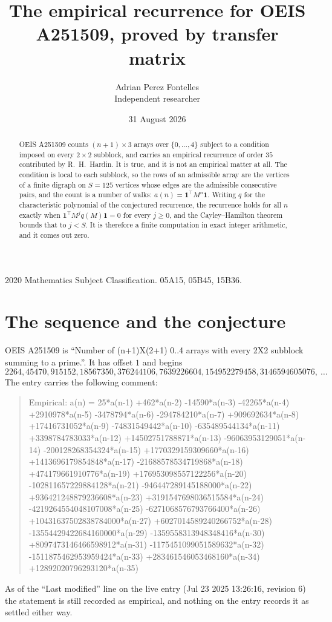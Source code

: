 \documentclass[11pt,a4paper]{article}
\title{The empirical recurrence for OEIS A251509, proved by transfer matrix}
\author{Adrian Perez Fontelles\\ \small Independent researcher}
\date{31 August 2026}
\theoremstyle{plain}
\theoremstyle{definition}
\begin{document}
\maketitle

\begin{abstract}
OEIS A251509 counts $(n+1)\times3$ arrays over $\{0,\dots,4\}$ subject to a condition imposed on
every $2\times2$ subblock, and carries an empirical recurrence of order $35$ contributed
by R.~H.~Hardin. It is true, and it is not an empirical matter at all. The condition is local
to each subblock, so the rows of an admissible array are the vertices of a finite digraph
on $S=125$ vertices whose edges are the admissible consecutive pairs, and the count is a
number of walks: $a(n)=\mathbf{1}^{\!\top}M^{n}\mathbf{1}$. Writing $q$
for the characteristic polynomial of the conjectured recurrence, the recurrence holds for all
$n$ exactly when $\mathbf{1}^{\!\top}M^{j}q(M)\mathbf{1}=0$ for every $j\ge0$, and the
Cayley--Hamilton theorem bounds that to $j<S$. It is therefore a finite computation in exact
integer arithmetic, and it comes out zero.
\end{abstract}

\noindent\small 2020 Mathematics Subject Classification. 05A15, 05B45, 15B36.\normalsize

\section{The sequence and the conjecture}

OEIS A251509 is ``Number of (n+1)X(2+1) 0..4 arrays with every 2X2 subblock summing to a prime.''. It has offset $1$ and begins
\[
2264, 45470, 915152, 18567350, 376244106, 7639226604, 154952279458, 3146594605076,\ \dots
\]
The entry carries the following comment:
\begin{quote}\small
Empirical: a(n) = 25*a(n-1) +462*a(n-2) -14590*a(n-3) -42265*a(n-4) +2910978*a(n-5) -3478794*a(n-6) -294784210*a(n-7) +909692634*a(n-8) +17416731052*a(n-9) -74831549442*a(n-10) -635489544134*a(n-11) +3398784783033*a(n-12) +14502751788871*a(n-13) -96063953129051*a(n-14) -200128268354324*a(n-15) +1770329159309660*a(n-16) +1413696179854848*a(n-17) -21688578534719868*a(n-18) +474179661910776*a(n-19) +176953098557122256*a(n-20) -102811657229884128*a(n-21) -946447289145188000*a(n-22) +936421248879236608*a(n-23) +3191547698036515584*a(n-24) -4219264554048107008*a(n-25) -6271068576793766400*a(n-26) +10431637502838784000*a(n-27) +6027014589240266752*a(n-28) -13554429422684160000*a(n-29) -1359558313948348416*a(n-30) +8097473146466598912*a(n-31) -1175451099051589632*a(n-32) -1511875462953959424*a(n-33) +283461546053468160*a(n-34) +12892020796293120*a(n-35)
\end{quote}
As of the ``Last modified'' line on the live entry (Jul 23 2025 13:26:16, revision 6) the statement is
still recorded as empirical, and nothing on the entry records it as settled either way.
\end{document}

